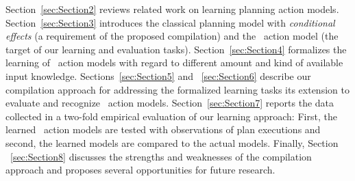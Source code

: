 Section~\ref{sec:Section2} reviews related work on learning planning action models. Section~\ref{sec:Section3} introduces the classical planning model with {\em conditional effects} (a requirement of the proposed compilation) and the \strips\ action model (the target of our learning and evaluation tasks). Section~\ref{sec:Section4} formalizes the learning of \strips\ action models with regard to different amount and kind of available input knowledge. Sections~\ref{sec:Section5} and ~\ref{sec:Section6} describe our compilation approach for addressing the formalized learning tasks its extension to evaluate and recognize \strips\ action models. Section~\ref{sec:Section7} reports the data collected in a two-fold empirical evaluation of our learning approach: First, the learned \strips\ action models are tested with observations of plan executions and second, the learned models are compared to the actual models. Finally, Section ~\ref{sec:Section8} discusses the strengths and weaknesses of the compilation approach and proposes several opportunities for future research.

 

